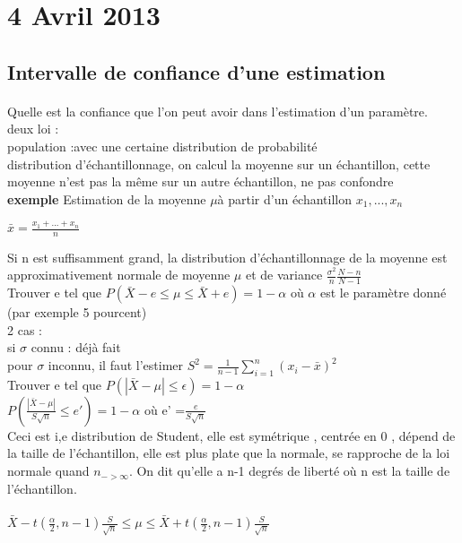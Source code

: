 \documentclass{article}
\begin{document}
\section{4 Avril 2013}
\subsection{Intervalle de confiance d'une estimation} 
\paragraph{} Quelle est la confiance que l'on peut avoir dans l'estimation d'un paramètre.\\deux loi : \\
population :avec une certaine distribution de probabilité\\
distribution d'échantillonnage, on calcul la moyenne sur un échantillon, cette moyenne n'est pas la même sur un autre échantillon, ne pas confondre\\\textbf{exemple} Estimation de la moyenne $\mu$à partir d'un échantillon $x_1,...,x_n$\\
\begin{center}
$\bar{x} = \frac{x_1+...+x_n}{n}$\\
\end{center}

Si n est suffisamment grand, la distribution d'échantillonnage de la moyenne est approximativement normale de moyenne $\mu$ et de variance $\frac{\sigma^2}{n}\frac{N-n}{N-1}$\\
Trouver e tel que $ P(\bar{X}-e \leq \mu \leq \bar{X}+e)=1-\alpha$ où $\alpha$ est le paramètre donné (par exemple 5 pourcent) \\
2 cas :\\
si $\sigma$ connu  : déjà fait\\
pour $\sigma$ inconnu, il faut l'estimer $S^2= \frac{1}{n-1} \sum_{i=1}^n (x_i -\bar{x})^2$\\
Trouver e tel que $ P(|\bar{X}-\mu| \leq \epsilon)=1-\alpha$\\
$P(\frac{|\bar{X}-\mu|}{S\sqrt{n}} \leq e') = 1-\alpha$ où e' =$ \frac{e}{S\sqrt{n}}$\\
Ceci est i,e distribution de Student, elle est symétrique , centrée en 0 , dépend de la taille de l'échantillon, elle est plus plate que la normale, se rapproche de la loi normale quand $n_{->\infty}$. On dit qu'elle a n-1 degrés de liberté où n est la taille de l'échantillon.\\\\
$\bar{X}-t(\frac{\alpha}{2},n-1)\frac{S}{\sqrt{n}} \leq \mu \leq \bar{X}+t(\frac{\alpha}{2},n-1)\frac{S}{\sqrt{n}}$\\\\
\end{document}
